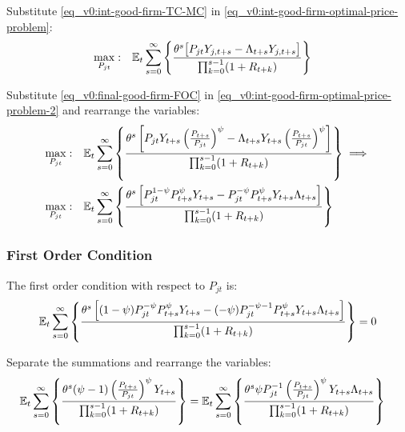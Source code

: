 \documentclass[../thesis.tex]{subfiles}
\begin{document}
	
	Substitute \ref{eq_v0:int-good-firm-TC-MC} in \ref{eq_v0:int-good-firm-optimal-price-problem}:
	\begin{align}
		\label{eq_v0:int-good-firm-optimal-price-problem-2}
		\max_{P_{jt}}: & \quad {\mathbb{E}_{t}} \sum_{s=0}^{\infty} \left\{ \frac{\theta^s \big[ P_{jt} Y_{j,t+s} - \Lambda_{t+s} Y_{j,t+s} \big]}{\prod_{k=0}^{s-1}(1+R_{t+k})} \right\}
	\end{align}
	
	Substitute \ref{eq_v0:final-good-firm-FOC} in \ref{eq_v0:int-good-firm-optimal-price-problem-2} and rearrange the variables:
	\begin{align}
		\max_{P_{jt}}: & \quad {\mathbb{E}_{t}} \sum_{s=0}^{\infty} \left\{ \frac{\theta^s \left[ P_{jt} Y_{t+s} \left( \frac{P_{t+s}}{P_{jt}} \right)^{\psi} - \Lambda_{t+s} Y_{t+s} \left( \frac{P_{t+s}}{P_{jt}} \right)^{\psi} \right] }{\prod_{k=0}^{s-1}(1+R_{t+k})} \right\} \implies \nonumber 
		\\
		\max_{P_{jt}}: & \quad {\mathbb{E}_{t}} \sum_{s=0}^{\infty} \left\{ \frac{\theta^s \left[ P_{jt}^{1-\psi} P_{t+s}^{\psi} Y_{t+s} - P_{jt}^{-\psi} P_{t+s}^{\psi} Y_{t+s} \Lambda_{t+s} \right] }{\prod_{k=0}^{s-1}(1+R_{t+k})} \right\} \nonumber
	\end{align}
	
	
	\subsubsection*{First Order Condition}
	
	The first order condition with respect to $P_{jt}$ is:
	\begin{align}
		& \quad {\mathbb{E}_{t}} \sum_{s=0}^{\infty} \left\{ \frac{\theta^s \left[ (1-\psi) P_{jt}^{-\psi} P_{t+s}^{\psi} Y_{t+s} - (-\psi) P_{jt}^{-\psi-1} P_{t+s}^{\psi} Y_{t+s} \Lambda_{t+s} \right] }{\prod_{k=0}^{s-1}(1+R_{t+k})} \right\} = 0 \nonumber
	\end{align}
	
	
	Separate the summations and rearrange the variables:
	\begin{align}
		\label{eq_v0:int-good-firm-optimal-price-FOC}
		& {\mathbb{E}_{t}} \sum_{s=0}^{\infty} \left\{ \frac{\theta^s (\psi-1) \left( \frac{P_{t+s}} {P_{jt}} \right)^{\psi} Y_{t+s}} {\prod_{k=0}^{s-1} (1+R_{t+k})} \right\} = {\mathbb{E}_{t}} \sum_{s=0}^{\infty} \left\{ \frac{\theta^s \psi P_{jt}^{-1} \left( \frac{P_{t+s}} {P_{jt}} \right)^{\psi} Y_{t+s} \Lambda_{t+s} }{\prod_{k=0}^{s-1}(1+R_{t+k})} \right\}
	\end{align}
	
\end{document}
